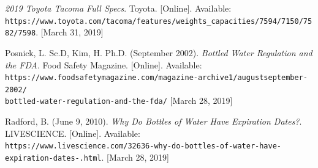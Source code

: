 \documentclass{article}
\begin{document}
\begin{thebibliography}{9}
\textit{2019 Toyota Tacoma Full Specs}. Toyota. [Online]. Available: \\\texttt{https://www.toyota.com/tacoma/features/weights\_capacities/7594/7150/7582/7598}. [March 31, 2019]

Posnick, L. Sc.D, Kim, H. Ph.D. (September 2002). \textit{Bottled Water Regulation and the FDA}. Food Safety Magazine. [Online]. Available:
\\\texttt{https://www.foodsafetymagazine.com/magazine-archive1/augustseptember-2002/}
\\\texttt{bottled-water-regulation-and-the-fda/}
[March 28, 2019]

Radford, B. (June 9, 2010). \textit{Why Do Bottles of Water Have Expiration Dates?}. LIVESCIENCE. [Online]. Available:
\\\texttt{https://www.livescience.com/32636-why-do-bottles-of-water-have-expiration-dates-.html}.
[March 28, 2019]

\end{thebibliography}
\end{document}
